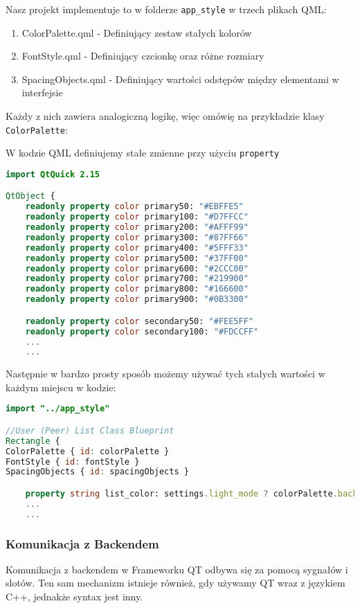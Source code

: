 Nasz projekt implementuje to w folderze \texttt{app\_style} w trzech plikach QML:

\begin{enumerate}
    \item ColorPalette.qml - Definiujący zestaw stałych kolorów
    \item FontStyle.qml - Definiujący czcionkę oraz różne rozmiary
    \item SpacingObjects.qml - Definiujący wartości odstępów między elementami w interfejsie
\end{enumerate}

Każdy z nich zawiera analogiczną logikę, więc omówię na przykładzie klasy \texttt{ColorPalette}:

W kodzie QML definiujemy stałe zmienne przy użyciu \texttt{property}

\begin{lstlisting}[language=QML, caption={ColorPalette.qml}]
import QtQuick 2.15

QtObject {
    readonly property color primary50: "#EBFFE5"
    readonly property color primary100: "#D7FFCC"
    readonly property color primary200: "#AFFF99"
    readonly property color primary300: "#87FF66"
    readonly property color primary400: "#5FFF33"
    readonly property color primary500: "#37FF00"
    readonly property color primary600: "#2CCC00"
    readonly property color primary700: "#219900"
    readonly property color primary800: "#166600"
    readonly property color primary900: "#0B3300"

    readonly property color secondary50: "#FEE5FF"
    readonly property color secondary100: "#FDCCFF"
    ...
    ...
\end{lstlisting}

Następnie w bardzo prosty sposób możemy używać tych stałych wartości w każdym miejscu w kodzie:
\begin{lstlisting}[language=QML, caption={Przykładowe użycie palety kolorów}]
import "../app_style"

//User (Peer) List Class Blueprint
Rectangle {
ColorPalette { id: colorPalette }
FontStyle { id: fontStyle }
SpacingObjects { id: spacingObjects }

    property string list_color: settings.light_mode ? colorPalette.background50 : colorPalette.background800
    ...
    ...
\end{lstlisting}  

\subsubsection{Komunikacja z Backendem}
\label{sec:KomunikacjaZBackendem}
Komunikacja z backendem w Frameworku QT odbywa się za pomocą sygnałów i slotów. Ten sam mechanizm istnieje również, gdy używamy QT wraz z językiem C++, jednakże syntax jest inny. 

